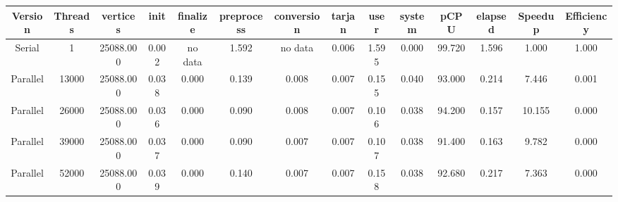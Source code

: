 \begin{tabular}{|c|c|c|c|c|c|c|c|c|c|c|c|c|c|}
\toprule
 Version &  Threads &  vertices &  init & finalize &  preprocess & conversion &  tarjan &  user &  system &   pCPU &  elapsed &  Speedup &  Efficiency \\
\midrule
  Serial &        1 & 25088.000 & 0.002 &  no data &       1.592 &    no data &   0.006 & 1.595 &   0.000 & 99.720 &    1.596 &    1.000 &       1.000 \\
Parallel &    13000 & 25088.000 & 0.038 &    0.000 &       0.139 &      0.008 &   0.007 & 0.155 &   0.040 & 93.000 &    0.214 &    7.446 &       0.001 \\
Parallel &    26000 & 25088.000 & 0.036 &    0.000 &       0.090 &      0.008 &   0.007 & 0.106 &   0.038 & 94.200 &    0.157 &   10.155 &       0.000 \\
Parallel &    39000 & 25088.000 & 0.037 &    0.000 &       0.090 &      0.007 &   0.007 & 0.107 &   0.038 & 91.400 &    0.163 &    9.782 &       0.000 \\
Parallel &    52000 & 25088.000 & 0.039 &    0.000 &       0.140 &      0.007 &   0.007 & 0.158 &   0.038 & 92.680 &    0.217 &    7.363 &       0.000 \\
\bottomrule
\end{tabular}
